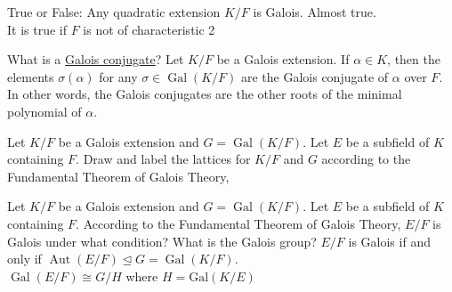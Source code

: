 \documentclass[avery5371,grid]{flashcards}
\DeclareMathOperator{\Aut}{Aut}
\DeclareMathOperator{\Gal}{Gal}
\begin{document}
\begin{flashcard}[Fields]{True or False: Any quadratic extension $K/F$ is Galois.}
 Almost true. \\
 
 It is true if $F$ is not of characteristic 2
\end{flashcard}

\begin{flashcard}[Fields]{What is a \underline{Galois conjugate}?}
 Let $K/F$ be a Galois extension. If $\alpha \in K$, then the elements $\sigma(\alpha)$ for any $\sigma \in \Gal(K/F)$ are the Galois conjugate of $\alpha$ over $F$. In other words, the Galois conjugates are the other roots of the minimal polynomial of $\alpha$.
\end{flashcard}

\begin{flashcard}[Fields]{Let $K/F$ be a Galois extension and $G = \Gal(K/F)$. Let $E$ be a subfield of $K$ containing $F$. Draw and label the lattices for $K/F$ and $G$ according to the Fundamental Theorem of Galois Theory, }
\begin{center}
\end{center}
\end{flashcard}

\begin{flashcard}[Fields]{Let $K/F$ be a Galois extension and $G = \Gal(K/F)$. Let $E$ be a subfield of $K$ containing $F$. According to the Fundamental Theorem of Galois Theory, $E/F$ is Galois under what condition? What is the Galois group?}
 $E/F$ is Galois if and only if $\Aut(E/F) \trianglelefteq G = \Gal(K/F)$.\\
 
 $\Gal(E/F) \cong G/H$
 where $H=\text{Gal}(K/E)$
\end{flashcard}
\end{document}
